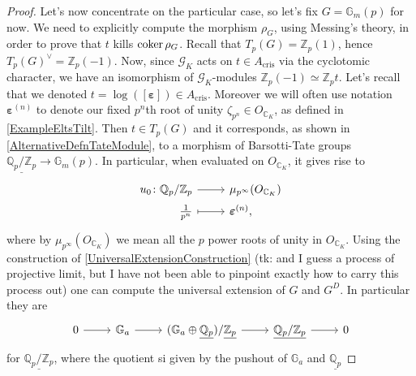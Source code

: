 \begin{proof}
	Let's now concentrate on the particular case, so let's fix $G = \mathbb{G}_m(p)$ for now.
	We need to explicitly compute the morphism $\rho_G$, using Messing's theory,
	in order to prove that $t$ kills $\operatorname{coker} \rho_G$.
	Recall that $T_p(G) = \mathbb{Z}_{p}(1)$, hence $T_p(G)^\vee = \mathbb{Z}_{p}(-1)$.
	Now, since $\mathscr{G}_{K}$ acts on $t \in A_{\mathrm{cris}}$ via the cyclotomic
	character, we have an isomorphism of $\mathscr{G}_{K}$-modules $\mathbb{Z}_{p}(-1)
	\simeq \mathbb{Z}_{p} t$.
	Let's recall that we denoted $t = \log([\boldsymbol\varepsilon]) \in A_{\mathrm{cris}}$.
	Moreover we will often use notation $\boldsymbol\varepsilon^{(n)}$ to denote
	our fixed $p^n$th root of unity $\zeta_{p^n} \in O_{\mathbb{C}_K}$,
	as defined in \cref{ExampleEltsTilt}.
	Then $t \in T_p(G)$ and it corresponds, as shown in \cref{AlternativeDefnTateModule},
	to a morphism of Barsotti-Tate groups $\underline{\mathbb{Q}_p/\mathbb{Z}_{p}} \to \mathbb{G}_m(p)$.
	In particular, when evaluated on $O_{\mathbb{C}_K}$, it gives rise to
	\begin{equation*}
	\begin{tikzcd}[row sep = 0ex
		,/tikz/column 1/.append style={anchor=base east}
		,/tikz/column 2/.append style={anchor=base west}]
		u_0\colon 
		\mathbb{Q}_p/\mathbb{Z}_{p}
		\arrow[r, "", rightarrow] &
		\mu_{p^\infty}(O_{\mathbb{C}_K}) \\
		\frac{ 1 }{ p^n } \arrow[r, "", mapsto] & 
		\boldsymbol\varepsilon^{(n)}
	,\end{tikzcd}
	\end{equation*} 
	where by $\mu_{p^\infty}(O_{\mathbb{C}_K})$ we mean all the $p$ power 
	roots of unity in $O_{\mathbb{C}_K}$.
	Using the construction of \cref{UniversalExtensionConstruction} 
	(tk: and I guess a process of projective limit, but I have not been able to
	pinpoint exactly how to carry this process out)
	one can compute the universal extension of $G$ and $G^D$.
	In particular they are
	\begin{equation*}
	\begin{tikzcd}
		0 \arrow[r, "", rightarrow] &
		\mathbb{G}_a \arrow[r, "", rightarrow] &
		(\mathbb{G}_a \oplus \underline{\mathbb{Q}_p}) / \underline{\mathbb{Z}_{p}} 
		\arrow[r, "", rightarrow] &
		\underline{\mathbb{Q}_p/\mathbb{Z}_{p}} \arrow[r, "", rightarrow] &
		0
	\end{tikzcd}
	\end{equation*}
	for $\underline{\mathbb{Q}_p/\mathbb{Z}_{p}}$, where the quotient
	si given by the pushout of $\mathbb{G}_a$ and $\underline{\mathbb{Q}_p}$

\end{proof}
